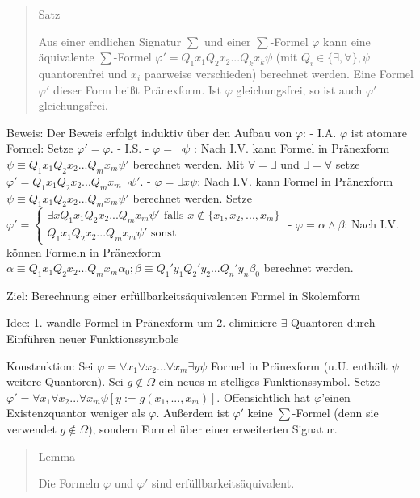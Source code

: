 \documentclass[a4paper]{article}
\begin{document}
\begin{multicols}{3}
  \begin{quote}
    Satz

    Aus einer endlichen Signatur $\sum$ und einer $\sum$-Formel $\varphi$
    kann eine äquivalente $\sum$-Formel
    $\varphi'=Q_1 x_1 Q_2 x_2 ...Q_k x_k \psi$ (mit
    $Q_i\in\{\exists,\forall\},\psi$ quantorenfrei und $x_i$ paarweise
    verschieden) berechnet werden. Eine Formel $\varphi'$ dieser Form heißt
    Pränexform. Ist $\varphi$ gleichungsfrei, so ist auch $\varphi'$
    gleichungsfrei.
  \end{quote}

  Beweis: Der Beweis erfolgt induktiv über den Aufbau von $\varphi$: -
  I.A. $\varphi$ ist atomare Formel: Setze $\varphi'=\varphi$. - I.S. -
  $\varphi=\lnot\psi$ : Nach I.V. kann Formel in Pränexform
  $\psi\equiv Q_1 x_1 Q_2 x_2 ...Q_m x_m \psi'$ berechnet werden. Mit
  $\forall=\exists$ und $\exists=\forall$ setze
  $\varphi'=Q_1 x_1 Q_2 x_2 ...Q_m x_m\lnot\psi'$. -
  $\varphi=\exists x\psi$: Nach I.V. kann Formel in Pränexform
  $\psi\equiv Q_1 x_1 Q_2 x_2 ...Q_m x_m \psi'$ berechnet werden. Setze
  $\varphi'= \begin{cases} \exists x Q_1 x_1 Q_2 x_2 ...Q_m x_m\psi'\text{ falls }x\not\in\{x_1,x_2,...,x_m\}\\ Q_1 x_1 Q_2 x_2 ...Q_m x_m\psi'\text{ sonst}\end{cases}$
  - $\varphi=\alpha\wedge\beta$: Nach I.V. können Formeln in Pränexform
  $\alpha\equiv Q_1 x_1 Q_2 x_2 ...Q_mx_m \alpha_0; \beta\equiv Q_1'y_1 Q_2'y_2 ...Q_n'y_n \beta_0$
  berechnet werden.

  Ziel: Berechnung einer erfüllbarkeitsäquivalenten Formel in Skolemform

  Idee: 1. wandle Formel in Pränexform um 2. eliminiere
  $\exists$-Quantoren durch Einführen neuer Funktionssymbole

  Konstruktion: Sei
  $\varphi=\forall x_1\forall x_2...\forall x_m\exists y\psi$ Formel in
  Pränexform (u.U. enthält $\psi$ weitere Quantoren). Sei $g\not\in\Omega$
  ein neues m-stelliges Funktionssymbol. Setze
  $\varphi'=\forall x_1\forall x_2...\forall x_m \psi[y:=g(x_1,...,x_m)]$.
  Offensichtlich hat $\varphi$'einen Existenzquantor weniger als
  $\varphi$. Außerdem ist $\varphi'$ keine $\sum$-Formel (denn sie
  verwendet $g\not\in\Omega$), sondern Formel über einer erweiterten
  Signatur.

  \begin{quote}
    Lemma

    Die Formeln $\varphi$ und $\varphi'$ sind erfüllbarkeitsäquivalent.
  \end{quote}


\end{multicols}
\end{document}
